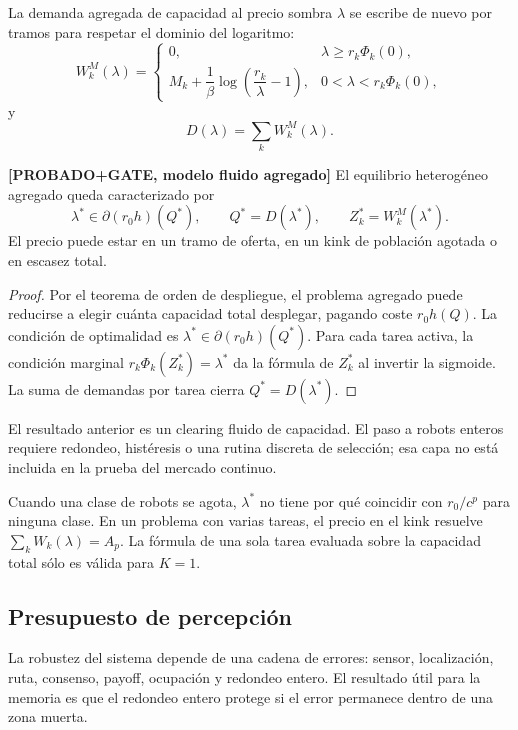 La demanda agregada de capacidad al precio sombra $\lambda$ se escribe de nuevo por
tramos para respetar el dominio del logaritmo:
\[
  W_k^M(\lambda)=
  \begin{cases}
  0,
  & \lambda\ge r_k\Phi_k(0),\\[4pt]
  M_k+\dfrac{1}{\beta}\log\!\left(\dfrac{r_k}{\lambda}-1\right),
  & 0<\lambda<r_k\Phi_k(0),
  \end{cases}
\]
y
\[
  D(\lambda)=
  \sum_k W_k^M(\lambda).
\]

\begin{teorema} \textbf{[PROBADO+GATE, modelo fluido agregado]}
El equilibrio heterogéneo agregado queda caracterizado por
\[
  \lambda^*\in\partial(r_0h)(Q^*),
  \qquad
  Q^*=D(\lambda^*),
  \qquad
  Z_k^*=W_k^M(\lambda^*).
\]
El precio puede estar en un tramo de oferta, en un kink de población agotada o en
escasez total.
\end{teorema}

\begin{proof}
Por el teorema de orden de despliegue, el problema agregado puede reducirse a elegir
cuánta capacidad total desplegar, pagando coste $r_0h(Q)$. La condición de optimalidad
es $\lambda^*\in\partial(r_0h)(Q^*)$. Para cada tarea activa, la condición marginal
$r_k\Phi_k(Z_k^*)=\lambda^*$ da la fórmula de $Z_k^*$ al invertir la sigmoide. La suma
de demandas por tarea cierra $Q^*=D(\lambda^*)$.
\end{proof}

El resultado anterior es un clearing fluido de capacidad. El paso a robots enteros
requiere redondeo, histéresis o una rutina discreta de selección; esa capa no está
incluida en la prueba del mercado continuo.

\begin{observacion}
Cuando una clase de robots se agota, $\lambda^*$ no tiene por qué coincidir con
$r_0/c^p$ para ninguna clase. En un problema con varias tareas, el precio en el kink
resuelve $\sum_k W_k(\lambda)=A_p$. La fórmula de una sola tarea evaluada sobre la
capacidad total sólo es válida para $K=1$.
\end{observacion}

\subsection{Presupuesto de percepción}

La robustez del sistema depende de una cadena de errores: sensor, localización, ruta,
consenso, payoff, ocupación y redondeo entero. El resultado útil para la memoria es que
el redondeo entero protege si el error permanece dentro de una zona muerta.

